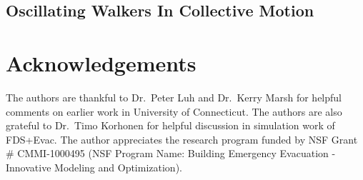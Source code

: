 \documentclass{article}
\begin{document}
\section{Oscillating Walkers In Collective Motion}


\chapter*{Acknowledgements}

\noindent The authors are thankful to Dr.\ Peter Luh and Dr.\ Kerry Marsh for helpful comments on earlier work in University of Connecticut.   The authors are also grateful to Dr.\ Timo Korhonen for helpful discussion in simulation work of FDS+Evac.  The author appreciates the  research program funded by NSF Grant # CMMI-1000495 (NSF Program Name: Building Emergency Evacuation - Innovative Modeling and Optimization).

\clearpage

\newpage
\end{document}
